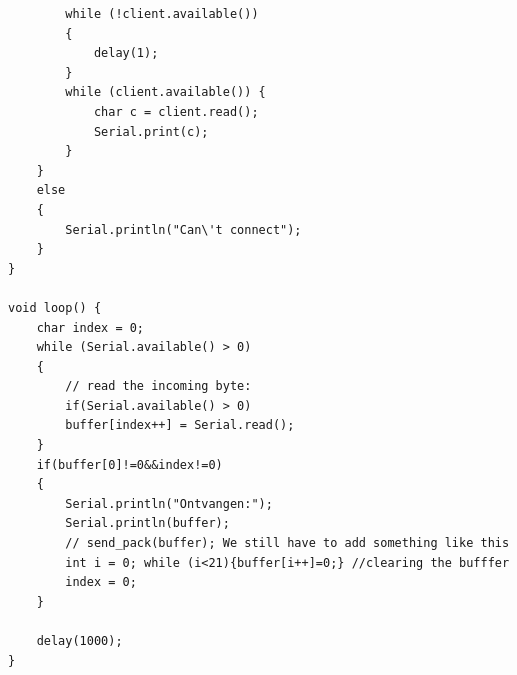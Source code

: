 \documentclass[12pt]{article}
\begin{document}
\begin{lstlisting}
        while (!client.available())
        {
        	delay(1);
        }
        while (client.available()) {
        	char c = client.read();
        	Serial.print(c);
        }
    }
    else
    {
    	Serial.println("Can\'t connect");
    }
}

void loop() {
	char index = 0;
	while (Serial.available() > 0) 
	{
        // read the incoming byte:
        if(Serial.available() > 0)
        buffer[index++] = Serial.read();
    }
    if(buffer[0]!=0&&index!=0)
    {
    	Serial.println("Ontvangen:");
    	Serial.println(buffer);
    	// send_pack(buffer); We still have to add something like this
		int i = 0; while (i<21){buffer[i++]=0;} //clearing the bufffer
		index = 0;
	}

	delay(1000);
}
\end{lstlisting}
\end{document}
